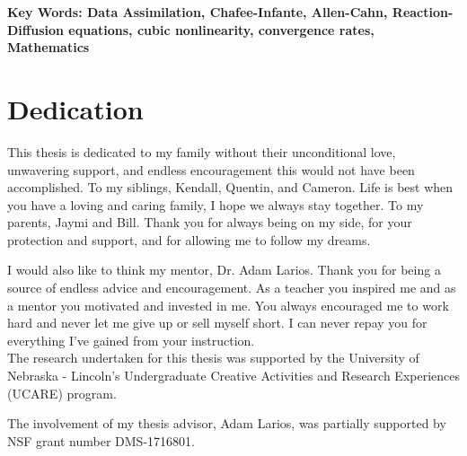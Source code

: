 \documentclass[12pt]{amsart}
\theoremstyle{plain}
\theoremstyle{definition}
\theoremstyle{remark}
\numberwithin{equation}{section} %
\numberwithin{figure}{section}   %
\newcounter{my_counter}
\begin{document}
\bfseries{Key Words:}
\normalfont
Data Assimilation, Chafee-Infante, Allen-Cahn, Reaction-Diffusion equations, cubic nonlinearity, convergence rates, Mathematics 
\newpage
{}

\section*{Dedication}\label{dedication}
This thesis is dedicated to my family without their unconditional love, unwavering support, and endless encouragement this would not have been accomplished. To my siblings, Kendall, Quentin, and Cameron. Life is best when you have a loving and caring family, I hope we always stay together. To my parents, Jaymi and Bill. Thank you for always being on my side, for your protection and support, and for allowing me to follow my dreams.

I would also like to think my mentor, Dr. Adam Larios. Thank you for being a source of endless advice and encouragement. As a teacher you inspired me and as a mentor you motivated and invested in me. You  always encouraged me to work hard and never let me give up or sell myself short. I can never repay you for everything I've gained from your instruction.\\

The research undertaken for this thesis was supported by the University of Nebraska - Lincoln's Undergraduate Creative Activities and Research Experiences (UCARE) program.

The involvement of my thesis advisor, Adam Larios, was partially supported by NSF grant number DMS-1716801.
\newpage
{}
\end{document}
